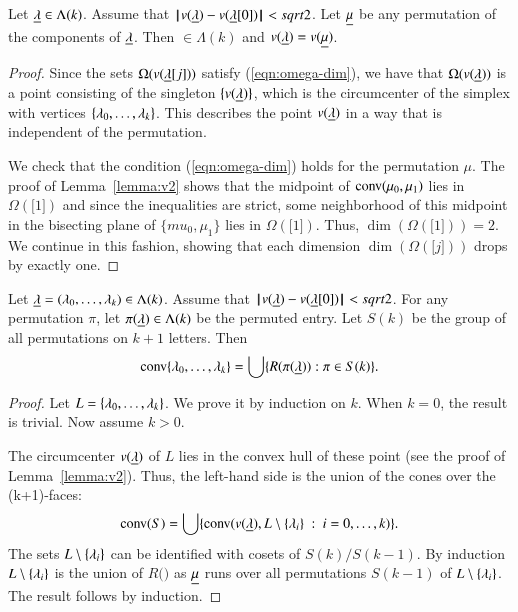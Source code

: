 \begin{lemma}   Let ${\underline{\lambda}}\in\Lambda(k)$.  Assume that ${\hskip0.1em|\hskip-0.15em|\hskip0.1em}v({\underline{\lambda}}) - v({\underline{\lambda}}[0]){\hskip0.1em|\hskip-0.15em|\hskip0.1em}<sqrt2$.
Let ${\underline{\mu}}$ be any permutation of the components of ${\underline{\lambda}}$.  Then $\bm\in\Lambda(k)$ and
 $v({\underline{\lambda}}) = v({\underline{\mu}})$.
\end{lemma}

\begin{proof} 
Since the sets $\Omega(v({\underline{\lambda}}[j]))$ satisfy (\ref{eqn:omega-dim}), we have that
$\Omega(v({\underline{\lambda}}))$ is a point consisting of the singleton $\{v({\underline{\lambda}})\}$, which is the
circumcenter of the simplex with vertices $\{\lambda_0,\ldots,\lambda_k\}$.  This describes
the point $v({\underline{\lambda}})$ in a way that is independent of the permutation.

We check that the condition (\ref{eqn:omega-dim}) holds for the permutation $\mu$.
The proof of Lemma~\ref{lemma:v2} shows that the midpoint of ${\operatorname{conv}}(\mu_0,\mu_1)$
lies in $\Omega(\bm[1])$ and since the inequalities are strict, some neighborhood
of this midpoint in the bisecting plane of $\{mu_0,\mu_1\}$ lies in $\Omega(\bm[1])$.
Thus, $\dim(\Omega(\bm[1]))=2$.  We continue in this fashion, showing that each dimension
$\dim(\Omega(\bm[j]))$ drops by exactly one.
\end{proof}

\begin{lemma}\label{lemma:Rconv} Let ${\underline{\lambda}} = (\lambda_0,\ldots,\lambda_k)\in\Lambda(k)$.  Assume that ${\hskip0.1em|\hskip-0.15em|\hskip0.1em}v({\underline{\lambda}}) - v({\underline{\lambda}}[0]){\hskip0.1em|\hskip-0.15em|\hskip0.1em}<sqrt2$.
For any permutation $\pi$, let $\pi({\underline{\lambda}})\in\Lambda(k)$ be the permuted entry.  Let
$S(k)$ be the group of all permutations on $k+1$ letters.   Then
$$
{\operatorname{conv}}\{\lambda_0,\ldots,\lambda_k\} = \bigcup \{ R(\pi({\underline{\lambda}})) : \pi\in S(k)\}.
$$
\end{lemma}

\begin{proof} Let $L = \{\lambda_0,\ldots,\lambda_k\}$.  We prove it by induction on $k$.
When $k=0$, the result is trivial.  Now assume $k>0$.

The circumcenter $v({\underline{\lambda}})$ of $L$ lies in the convex hull of these
point (see the proof of Lemma~\ref{lemma:v2}).  Thus, the left-hand side is the union
of the cones over the (k+1)-faces:
$$
{\operatorname{conv}}(S) = \bigcup\{ {\operatorname{conv}}(v({\underline{\lambda}}),L\setminus \{\lambda_i\}\ :\  i=0,\ldots,k) \}.
$$
The sets $L\setminus \{\lambda_i\}$ can be identified with  cosets of $S(k)/S(k-1)$.
By induction $L\setminus \{\lambda_i\}$ is the union of $R(\bm)$ as ${\underline{\mu}}$ runs
over all permutations $S(k-1)$ of $L\setminus \{\lambda_i\}$.
The result follows by induction.
\end{proof}

